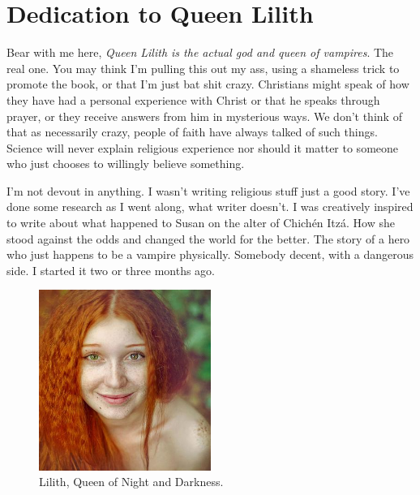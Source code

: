 \documentclass[12pt,twoside,onecolumn,openright,extrafontsizes]{memoir}
\def\chichenitza*{Chich\'{e}n Itz\'{a}}
\begin{document}
\begin{center}
\itshape{}
\end{center}

\frontmatter
\pagestyle{mystyle}

\chapter*{Dedication to Queen Lilith}
{Bear with me here, \textit{Queen Lilith is the actual god and queen of vampires}. The real one. You may think I'm pulling this out my ass, using a shameless trick to promote the book, or that I'm just bat shit crazy. Christians might speak of how they have had a personal experience with Christ or that he speaks through prayer, or they receive answers from him in mysterious ways. We don't think of that as necessarily crazy, people of faith have always talked of such things. Science will never explain religious experience nor should it matter to someone who just chooses to willingly believe something.
	
I'm not devout in anything. I wasn't writing religious stuff just a good story. I've done some research as I went along, what writer doesn't. I was creatively inspired to write about what happened to Susan on the alter of \chichenitza*. How she stood against the odds and changed the world for the better. The story of a hero who just happens to be a vampire physically. Somebody decent, with a dangerous side. I started it two or three months ago.

	\begin{figure}
		\centering
		\includegraphics[width=0.50\textwidth]{Images/ginger-girl}
		\\ {\small Lilith, Queen of Night and Darkness.}
	\end{figure}

}
\end{document}
